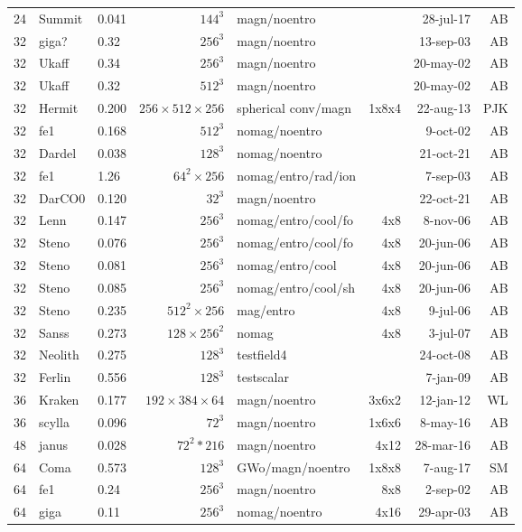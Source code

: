 \documentclass[\mydriver,12pt,twoside,notitlepage,a4paper]{article}
\begin{document}
\begin{center}
\begin{footnotesize}
\begin{longtable}{rllrlrrr}
  24 &Summit & 0.041& $144^3$ & magn/noentro &        & 28-jul-17 & AB \\
  32 & giga? & 0.32 & $256^3$ & magn/noentro &        & 13-sep-03 & AB \\
  32 & Ukaff & 0.34 & $256^3$ & magn/noentro &        & 20-may-02 & AB \\
  32 & Ukaff & 0.32 & $512^3$ & magn/noentro &        & 20-may-02 & AB \\
  32 &Hermit&0.200&$256{\!\times\!}512{\!\times\!}256$&spherical conv/magn&1x8x4&22-aug-13&PJK\\
  32 & fe1   & 0.168& $512^3$ &nomag/noentro&        &  9-oct-02 & AB \\
  32 & Dardel& 0.038& $128^3$ &nomag/noentro&        & 21-oct-21 & AB \\
  32 & fe1   & 1.26 & $64^2{\!\times\!}256$ &nomag/entro/rad/ion& & 7-sep-03 & AB \\
  32 & DarCO0& 0.120& $32^3$  &magn/noentro &        & 22-oct-21 & AB \\
  32 & Lenn  & 0.147& $256^3$ &nomag/entro/cool/fo& 4x8 &  8-nov-06 & AB \\
  32 & Steno & 0.076& $256^3$ &nomag/entro/cool/fo& 4x8 & 20-jun-06 & AB \\
  32 & Steno & 0.081& $256^3$ &nomag/entro/cool& 4x8 & 20-jun-06 & AB \\
  32 & Steno & 0.085& $256^3$ &nomag/entro/cool/sh& 4x8 & 20-jun-06 & AB \\
  32 & Steno & 0.235& $512^2{\!\times\!}256$ &mag/entro& 4x8 &  9-jul-06 & AB \\
  32 & Sanss & 0.273& $128{\!\times\!}256^2$ &nomag& 4x8 &  3-jul-07 & AB \\
  32 &Neolith& 0.275& $128^3$ &testfield4& &24-oct-08 & AB \\
  32 &Ferlin & 0.556& $128^3$ &testscalar&  &7-jan-09 & AB \\
  36 &Kraken&0.177&$192{\!\times\!}384{\!\times\!}64$&magn/noentro&3x6x2&12-jan-12&WL\\
  36 &scylla &0.096&  $72^3$ & magn/noentro & 1x6x6  &  8-may-16 & AB \\
  48 & janus & 0.028 & $72^2*216$ & magn/noentro &  4x12   &  28-mar-16 & AB \\
  64 &Coma & 0.573 & $128^3$ & GWo/magn/noentro & 1x8x8  & 7-aug-17 & SM \\
  64 & fe1   & 0.24 & $256^3$ & magn/noentro &  8x8   &  2-sep-02 & AB \\
  64 & giga  & 0.11 & $256^3$ &nomag/noentro&  4x16  & 29-apr-03 & AB \\

\end{longtable}
\end{footnotesize}
\end{center}
\end{document}
